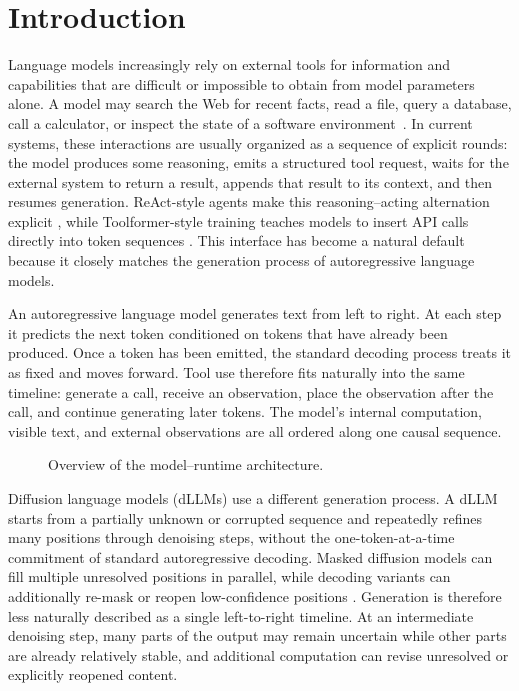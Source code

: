 \section{Introduction}
\label{sec:introduction}

Language models increasingly rely on external tools for information and capabilities that are difficult or impossible to obtain from model parameters alone. A model may search the Web for recent facts, read a file, query a database, call a calculator, or inspect the state of a software environment~\citep{karpas2022mrkl,gao2023pal}. In current systems, these interactions are usually organized as a sequence of explicit rounds: the model produces some reasoning, emits a structured tool request, waits for the external system to return a result, appends that result to its context, and then resumes generation. ReAct-style agents make this reasoning--acting alternation explicit \citep{yao2022react}, while Toolformer-style training teaches models to insert API calls directly into token sequences \citep{schick2023toolformer}. This interface has become a natural default because it closely matches the generation process of autoregressive language models.

An autoregressive language model generates text from left to right. At each step it predicts the next token conditioned on tokens that have already been produced. Once a token has been emitted, the standard decoding process treats it as fixed and moves forward. Tool use therefore fits naturally into the same timeline: generate a call, receive an observation, place the observation after the call, and continue generating later tokens. The model's internal computation, visible text, and external observations are all ordered along one causal sequence.

\begin{figure}[t!]
  \centering
  
  \caption{Overview of the \cid model--runtime architecture.}
  \label{fig:cid-overview}
\end{figure}

Diffusion language models (dLLMs) use a different generation process. A dLLM starts from a partially unknown or corrupted sequence and repeatedly refines many positions through denoising steps, without the one-token-at-a-time commitment of standard autoregressive decoding. Masked diffusion models can fill multiple unresolved positions in parallel, while decoding variants can additionally re-mask or reopen low-confidence positions \citep{nie2025llada,arriola2025blockdiffusion,ye2025dream,huang2025remedi}. Generation is therefore less naturally described as a single left-to-right timeline. At an intermediate denoising step, many parts of the output may remain uncertain while other parts are already relatively stable, and additional computation can revise unresolved or explicitly reopened content.

